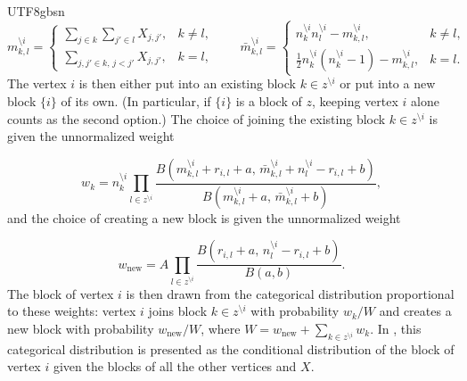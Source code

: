\documentclass[12pt]{report}
\theoremstyle{plain}
\theoremstyle{definition}
\begin{document}
\begin{CJK*}{UTF8}{gbsn}
\begin{equation*}
  m_{k,l}^{\setminus i} =
  \begin{cases}
    \displaystyle \sum_{j \in k} \sum_{j' \in l} X_{j,j'}, & k \neq l, \\[1.2em]
    \displaystyle \sum_{j, j' \in k,\, j < j'} X_{j,j'}, & k = l,
  \end{cases}
  \qquad
  \bar{m}_{k,l}^{\setminus i} =
  \begin{cases}
    n_k^{\setminus i} n_l^{\setminus i} - m_{k,l}^{\setminus i}, & k \neq l, \\[0.5em]
    \frac{1}{2} n_k^{\setminus i} (n_k^{\setminus i} - 1) - m_{k,l}^{\setminus i}, & k = l.
  \end{cases}
\end{equation*}
The vertex $i$ is then either put into an existing block $k \in z^{\setminus i}$
or put into a new block $\{i\}$ of its own.
(In particular, if $\{i\}$ is a block of $z$, keeping vertex $i$ alone counts as the second option.)
The choice of joining the existing block $k \in z^{\setminus i}$ is given the unnormalized weight

\begin{equation}\label{eq:SM_weight_existing}
  w_k = n_k^{\setminus i}
  \prod_{l \in z^{\setminus i}}
  \frac{B(m_{k,l}^{\setminus i} + r_{i,l} + a, \, \bar{m}_{k,l}^{\setminus i} + n_l^{\setminus i} - r_{i,l} + b)}{B(m_{k,l}^{\setminus i} + a, \, \bar{m}_{k,l}^{\setminus i} + b)},
\end{equation}
and the choice of creating a new block is given the unnormalized weight

\begin{equation}\label{eq:SM_weight_new}
  w_{\text{new}} = A
  \prod_{l \in z^{\setminus i}}
  \frac{B(r_{i,l} + a, \, n_l^{\setminus i} - r_{i,l} + b)}{B(a, b)}.
\end{equation}
The block of vertex $i$ is then drawn from the categorical distribution proportional to these weights:
vertex $i$ joins block $k \in z^{\setminus i}$ with probability $w_k / W$
and creates a new block with probability $w_{\text{new}} / W$, where
$W = w_{\text{new}} + \sum_{k \in z^{\setminus i}} w_k$.
In \cite{Schmidt_Morup_2013}, this categorical distribution is presented as the
conditional distribution of the block of vertex $i$ given the blocks of all the other vertices and $X$.


\end{CJK*}
\end{document}
